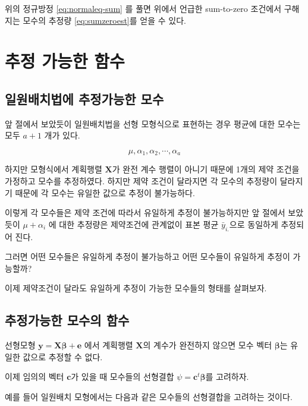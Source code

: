 \documentclass[
]{book}
\newcommand{\bm}[1]{\boldsymbol{\mathbf{#1}}}
\begin{document}
위의 정규방정 \eqref{eq:normaleq-sum} 를 풀면 위에서 언급한 sum-to-zero 조건에서 구해지는 모수의 추정량 \eqref{eq:sumzeroest}를 얻을 수 있다.

\hypertarget{estimable}{%
\chapter{추정 가능한 함수}\label{estimable}}

\hypertarget{uxc77cuxc6d0uxbc30uxce58uxbc95uxc5d0-uxcd94uxc815uxac00uxb2a5uxd55c-uxbaa8uxc218}{%
\section{일원배치법에 추정가능한 모수}\label{uxc77cuxc6d0uxbc30uxce58uxbc95uxc5d0-uxcd94uxc815uxac00uxb2a5uxd55c-uxbaa8uxc218}}

앞 절에서 보았듯이 일원배치법을 선형 모형식으로 표현하는 경우 평균에 대한 모수는 모두 \(a+1\) 개가 있다.

\[ \mu, \alpha_1, \alpha_2, \cdots, \alpha_a \]

하지만 모형식에서 계획행렬 \(\bm X\)가 완전 계수 행렬이 아니기 때문에 1개의 제약 조건을 가정하고 모수를 추정하였다.
하지만 제약 조건이 달라지면 각 모수의 추정량이 달라지기 때문에 각 모수는 유일한 값으로 추정이 불가능하다.

이렇게 각 모수들은 제약 조건에 따라서 유일하게 추정이 불가능하지만 앞 절에서 보았듯이 \(\mu + \alpha_i\) 에 대한 추정량은 제약조건에 관계없이
표본 평균 \(\bar y_{i.}\)으로 동일하게 추정되어 진다.

그러면 어떤 모수들은 유일하게 추정이 불가능하고 어떤 모수들이 유일하게 추정이 가능할까?

이제 제약조건이 달라도 유일하게 추정이 가능한 모수들의 형태를 살펴보자.

\hypertarget{uxcd94uxc815uxac00uxb2a5uxd55c-uxbaa8uxc218uxc758-uxd568uxc218}{%
\section{추정가능한 모수의 함수}\label{uxcd94uxc815uxac00uxb2a5uxd55c-uxbaa8uxc218uxc758-uxd568uxc218}}

선형모형 \(\bm y =\bm X \bm \beta + \bm e\) 에서 계획행렬 \(\bm X\)의 계수가 완전하지 않으면 모수 벡터 \(\bm \beta\)는 유일한 값으로 추정할 수 없다.

이제 임의의 벡터 \(\bm c\)가 있을 때 모수들의 선형결합 \(\psi = \bm c^t \bm \beta\)를 고려하자.

예를 들어 일원배치 모형에서는 다음과 같은 모수들의 선형결합을 고려하는 것이다.
\end{document}
